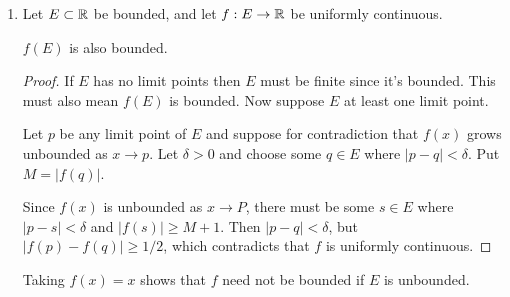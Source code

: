 \documentclass{article}
\begin{document}
\begin{enumerate}
\begin{enumerate}[a.]
\begin{proof}
If $b,m$ are nonzero then consider $h(x) = x^2 + (mx + b)^{2k}$. If $x = -m/b$
then $h(x) = m^2/b^2$. If $x \neq -m/b$ then $(mx +b)^{2k} > 0$ and so $h(x)$
is always nonzero.
\end{proof}
\end{enumerate}

\item Let $E \subset \mathbb{R}$ be bounded, and let $f: E \to \mathbb{R}$ be uniformly
      continuous.

\claim $f(E)$ is also bounded.
\begin{proof}
If $E$ has no limit points then $E$ must be finite since it's bounded. This must
also mean $f(E)$ is bounded. Now suppose $E$ at least one limit point.

Let $p$ be any limit point of $E$ and suppose for contradiction that $f(x)$
grows unbounded as $x \to p$. Let $\delta > 0$ and choose some $q \in E$ where
$| p - q | < \delta$. Put $M = |f(q)|$.

Since $f(x)$ is unbounded as $x \to P$, there must be some $s \in E$ where
$| p - s | < \delta$ and $|f(s)| \geq M + 1$. Then $| p - q | < \delta$, but
$| f(p) - f(q) | \geq 1/2$, which contradicts that $f$ is uniformly continuous.
\end{proof}

Taking $f(x) = x$ shows that $f$ need not be bounded if $E$ is unbounded.
\end{enumerate}
\end{document}
